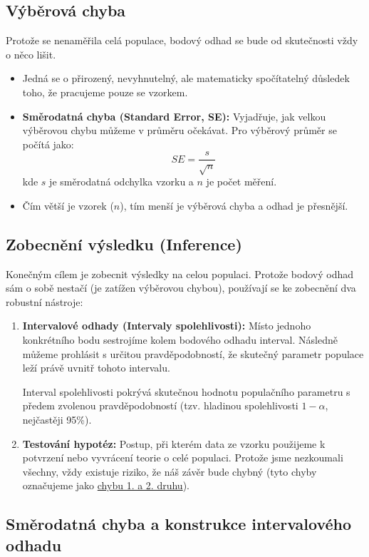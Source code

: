 \subsection{Výběrová chyba}
Protože se nenaměřila celá populace, bodový odhad se bude od skutečnosti vždy o něco lišit.
\begin{itemize}
    \item Jedná se o přirozený, nevyhnutelný, ale matematicky spočítatelný důsledek toho, že pracujeme pouze se vzorkem.
    \item \textbf{Směrodatná chyba (Standard Error, SE):} Vyjadřuje, jak velkou výběrovou chybu můžeme v průměru očekávat. Pro výběrový průměr se počítá jako:
    \[ SE = \frac{s}{\sqrt{n}} \]
    kde $s$ je směrodatná odchylka vzorku a $n$ je počet měření. 
    \item Čím větší je vzorek ($n$), tím menší je výběrová chyba a odhad je přesnější.
\end{itemize}

\subsection{Zobecnění výsledku (Inference)}
\label{sub:zob-vys}
Konečným cílem je zobecnit výsledky na celou populaci. Protože bodový odhad sám o sobě nestačí (je zatížen výběrovou chybou), používají se ke zobecnění dva robustní nástroje:
\begin{enumerate}
    \item \textbf{Intervalové odhady (Intervaly spolehlivosti):} Místo jednoho konkrétního bodu sestrojíme kolem bodového odhadu interval. Následně můžeme prohlásit s určitou pravděpodobností, že skutečný parametr populace leží právě uvnitř tohoto intervalu.
    
    Interval spolehlivosti pokrývá skutečnou hodnotu populačního parametru s předem zvolenou pravděpodobností (tzv. hladinou spolehlivosti $1-\alpha$, nejčastěji 95\%).

    \item \textbf{Testování hypotéz:} Postup, při kterém data ze vzorku použijeme k potvrzení nebo vyvrácení teorie o celé populaci. Protože jsme nezkoumali všechny, vždy existuje riziko, že náš závěr bude chybný (tyto chyby označujeme jako \hyperref[pg:chyby]{chybu 1. a 2. druhu}).
\end{enumerate}

\subsection{Směrodatná chyba a konstrukce intervalového odhadu}

